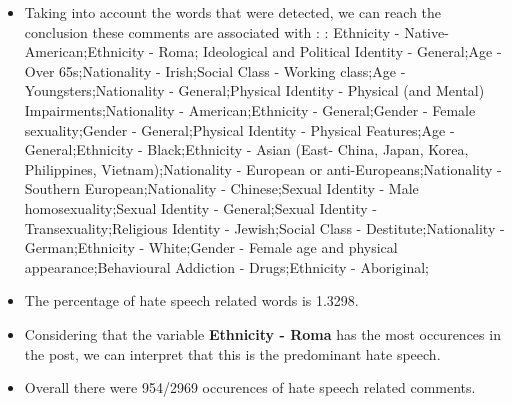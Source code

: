 \documentclass[11pt]{article}
\begin{document}
\begin{itemize}\item Taking into account the words that were detected, we can reach the conclusion these comments are associated with : : Ethnicity - Native-American;Ethnicity - Roma; Ideological and Political Identity - General;Age - Over 65s;Nationality - Irish;Social Class - Working class;Age - Youngsters;Nationality - General;Physical Identity - Physical (and Mental) Impairments;Nationality - American;Ethnicity - General;Gender - Female sexuality;Gender - General;Physical Identity - Physical Features;Age - General;Ethnicity - Black;Ethnicity - Asian (East- China, Japan, Korea, Philippines, Vietnam);Nationality - European or anti-Europeans;Nationality - Southern European;Nationality - Chinese;Sexual Identity - Male homosexuality;Sexual Identity - General;Sexual Identity - Transexuality;Religious Identity - Jewish;Social Class - Destitute;Nationality - German;Ethnicity - White;Gender - Female age and physical appearance;Behavioural Addiction - Drugs;Ethnicity - Aboriginal;%

\item The percentage of hate speech related words is 1.3298.

\item Considering that the variable \textbf{Ethnicity - Roma} has the most occurences in the post, we can interpret that this is the predominant hate speech.

\item Overall there were 954/2969 occurences of hate speech related comments.\end{itemize}
\end{document}
